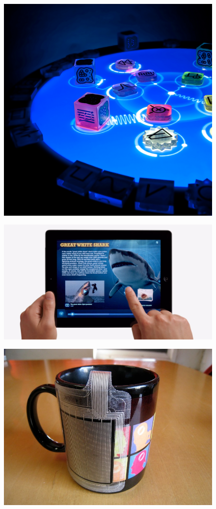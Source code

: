 \begin{figure}[h]
\centering
\begin{minipage}{.3\textwidth}
  \centering
  \includegraphics[width=0.8\linewidth]{figures/touch/reactable}
  \label{sofa_interaction:reactable}
\end{minipage}%
\hspace{0.2cm}
\begin{minipage}{.3\textwidth}
  \centering
  \includegraphics[width=0.8\linewidth]{figures/touch/ipad}
  \label{sofa_interaction:ipad}
\end{minipage}
\hspace{0.2cm}
\begin{minipage}{.3\textwidth}
  \centering
  \includegraphics[width=0.8\linewidth]{figures/touch/unmousepad}

\end{minipage}
\end{figure}
